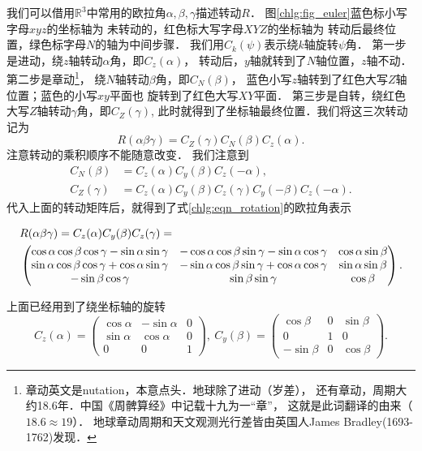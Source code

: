 我们可以借用$\mathbb{R}^3$中常用的欧拉角$\alpha,\beta,\gamma$描述转动$R$．
图\ref{chlg:fig_euler}蓝色标小写字母$xyz$的坐标轴为
未转动的，红色标大写字母$XYZ$的坐标轴为
转动后最终位置，绿色标字母$N$的轴为中间步骤．
我们用$C_k(\psi)$表示绕$k$轴旋转$\psi$角．
第一步是进动，绕$z$轴转动$\alpha$角，即$C_z(\alpha)$，
转动后，$y$轴就转到了$N$轴位置，$z$轴不动．
第二步是章动{\footnote{章动英文是nutation，本意{\kaishu 点头}．地球除了进动（岁差），
        还有章动，周期大约18.6年．中国《周髀算经》中记载十九为一“章”，
        这就是此词翻译的由来（$18.6\approx 19$）．
        地球章动周期和天文观测光行差皆由英国人James Bradley(1693-1762)发现．}}，
    绕$N$轴转动$\beta$角，即$C_N(\beta)$，
蓝色小写$z$轴转到了红色大写$Z$轴位置；蓝色的小写$xy$平面也
旋转到了红色大写$XY$平面．
第三步是自转，绕红色大写$Z$轴转动$\gamma$角，即$C_Z(\gamma)$,
此时就得到了坐标轴最终位置．我们将这三次转动记为
\begin{equation}\label{chlg:eqn_rotation}
    R(\alpha\beta\gamma)=C_Z(\gamma)C_N(\beta)C_z(\alpha) .
\end{equation}
注意转动的乘积顺序不能随意改变．%
我们注意到
\begin{align}
    C_N(\beta) &=C_z(\alpha)C_y(\beta)C_z(-\alpha) , \label{chlg:eqn_N_rotation} \\
    C_Z(\gamma)&=C_z(\alpha)C_y(\beta)C_z(\gamma)C_y(-\beta)C_z(-\alpha) . \label{chlg:eqn_Z_rotation}
\end{align}
代入上面的转动矩阵后，就得到了式\eqref{chlg:eqn_rotation}的欧拉角表示
\begin{small}
\begin{align}
        &R(\alpha\beta\gamma)=C_z(\alpha)C_{{y}}(\beta)C_z(\gamma) =  \label{chlg:eqn_rotation_euler_y} \\
        &\begin{pmatrix}
            \cos\alpha\cos\beta\cos\gamma -\sin\alpha \sin\gamma  &  -\cos\alpha \cos\beta \sin\gamma -\sin\alpha \cos\gamma & \cos\alpha \sin\beta  \\
            \sin\alpha\cos\beta\cos\gamma +\cos\alpha \sin\gamma  &  -\sin\alpha \cos\beta \sin\gamma +\cos\alpha \cos\gamma & \sin\alpha \sin\beta  \\
            -\sin\beta \cos\gamma & \sin\beta \sin\gamma & \cos\beta
        \end{pmatrix} . \notag 
\end{align}
\end{small}
上面已经用到了绕坐标轴的旋转
\begin{equation}\label{chlg:eqn_rotation-zy}
    {C_z}( \alpha  ) =  \begin{pmatrix}
        {\cos \alpha }&{ - \sin \alpha }&0 \\
        {\sin \alpha }&{\cos \alpha }&0 \\
        0&0&1
    \end{pmatrix} ,\
    {C_y}( \beta ) = \begin{pmatrix}
        {\cos \beta }&0&{  \sin \beta }  \\
        0&1&0\\
        { - \sin \beta } &0&{\cos \beta }
    \end{pmatrix}  .
\end{equation}
